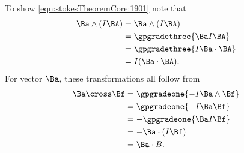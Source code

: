 {To show \cref{eqn:stokesTheoremCore:1901} note that
\begin{equation}\label{eqn:stokesTheoremCoreProblems:280}
\begin{aligned}
\Ba \wedge (I \BA)
&= \Ba \wedge (I \BA) \\
&= \gpgradethree{ \Ba I \BA } \\
&= \gpgradethree{ I \Ba \cdot \BA } \\
&= I (\Ba \cdot \BA).
\end{aligned}
\end{equation}
For vector \( \Ba \), these transformations all follow from
\begin{equation}\label{eqn:stokesTheoremCoreProblems:300}
\begin{aligned}
\Ba \cross \Bf
&= \gpgradeone{ -I \Ba \wedge \Bf} \\
&= \gpgradeone{ -I \Ba \Bf} \\
&= -\gpgradeone{ \Ba I \Bf} \\
&= -\Ba \cdot (I \Bf) \\
&= \Ba \cdot B.
\end{aligned}
\end{equation}
} %
